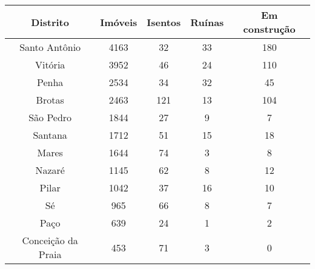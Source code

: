 \begin{table}[!htp]
\centering
{}
{\begin{tiny}
\begin{tabular}{ccccc}
\toprule
Distrito			&Imóveis	&Isentos	&Ruínas	&Em construção	\\
\midrule \midrule
Santo Antônio		&4163		&32			&33		&180			\\
Vitória				&3952		&46			&24		&110			\\
Penha				&2534		&34			&32		&45				\\
Brotas				&2463		&121		&13		&104			\\
São Pedro			&1844		&27			&9		&7				\\
Santana				&1712		&51			&15		&18				\\
Mares				&1644		&74			&3		&8				\\
Nazaré				&1145		&62			&8		&12				\\
Pilar				&1042		&37			&16		&10				\\
Sé					&965		&66			&8		&7				\\
Paço				&639		&24			&1		&2				\\
Conceição da Praia 	&453		&71			&3		&0				\\
\bottomrule
\end{tabular}
\end{tiny}}
{}
\end{table}